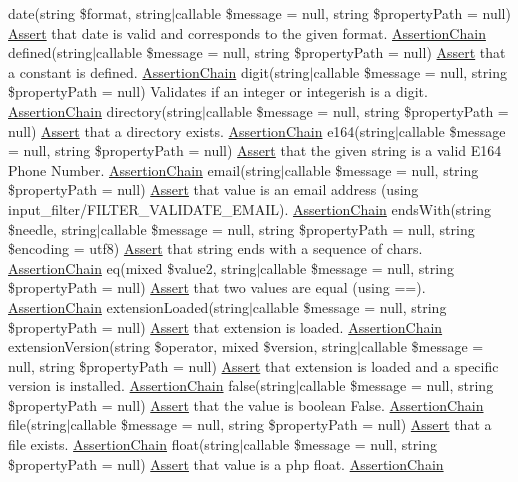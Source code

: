 date(string \$format, string$\vert$callable \$message = null, string \$property\+Path = null) \mbox{\hyperlink{class_assert_1_1_assert}{Assert}} that date is valid and corresponds to the given format.  \mbox{\hyperlink{class_assert_1_1_assertion_chain}{Assertion\+Chain}} defined(string$\vert$callable \$message = null, string \$property\+Path = null) \mbox{\hyperlink{class_assert_1_1_assert}{Assert}} that a constant is defined.  \mbox{\hyperlink{class_assert_1_1_assertion_chain}{Assertion\+Chain}} digit(string$\vert$callable \$message = null, string \$property\+Path = null) Validates if an integer or integerish is a digit.  \mbox{\hyperlink{class_assert_1_1_assertion_chain}{Assertion\+Chain}} directory(string$\vert$callable \$message = null, string \$property\+Path = null) \mbox{\hyperlink{class_assert_1_1_assert}{Assert}} that a directory exists.  \mbox{\hyperlink{class_assert_1_1_assertion_chain}{Assertion\+Chain}} e164(string$\vert$callable \$message = null, string \$property\+Path = null) \mbox{\hyperlink{class_assert_1_1_assert}{Assert}} that the given string is a valid E164 Phone Number.  \mbox{\hyperlink{class_assert_1_1_assertion_chain}{Assertion\+Chain}} email(string$\vert$callable \$message = null, string \$property\+Path = null) \mbox{\hyperlink{class_assert_1_1_assert}{Assert}} that value is an email address (using input\+\_\+filter/\+F\+I\+L\+T\+E\+R\+\_\+\+V\+A\+L\+I\+D\+A\+T\+E\+\_\+\+E\+M\+A\+IL).  \mbox{\hyperlink{class_assert_1_1_assertion_chain}{Assertion\+Chain}} ends\+With(string \$needle, string$\vert$callable \$message = null, string \$property\+Path = null, string \$encoding = \textquotesingle{}utf8\textquotesingle{}) \mbox{\hyperlink{class_assert_1_1_assert}{Assert}} that string ends with a sequence of chars.  \mbox{\hyperlink{class_assert_1_1_assertion_chain}{Assertion\+Chain}} eq(mixed \$value2, string$\vert$callable \$message = null, string \$property\+Path = null) \mbox{\hyperlink{class_assert_1_1_assert}{Assert}} that two values are equal (using ==).  \mbox{\hyperlink{class_assert_1_1_assertion_chain}{Assertion\+Chain}} extension\+Loaded(string$\vert$callable \$message = null, string \$property\+Path = null) \mbox{\hyperlink{class_assert_1_1_assert}{Assert}} that extension is loaded.  \mbox{\hyperlink{class_assert_1_1_assertion_chain}{Assertion\+Chain}} extension\+Version(string \$operator, mixed \$version, string$\vert$callable \$message = null, string \$property\+Path = null) \mbox{\hyperlink{class_assert_1_1_assert}{Assert}} that extension is loaded and a specific version is installed.  \mbox{\hyperlink{class_assert_1_1_assertion_chain}{Assertion\+Chain}} false(string$\vert$callable \$message = null, string \$property\+Path = null) \mbox{\hyperlink{class_assert_1_1_assert}{Assert}} that the value is boolean False.  \mbox{\hyperlink{class_assert_1_1_assertion_chain}{Assertion\+Chain}} file(string$\vert$callable \$message = null, string \$property\+Path = null) \mbox{\hyperlink{class_assert_1_1_assert}{Assert}} that a file exists.  \mbox{\hyperlink{class_assert_1_1_assertion_chain}{Assertion\+Chain}} float(string$\vert$callable \$message = null, string \$property\+Path = null) \mbox{\hyperlink{class_assert_1_1_assert}{Assert}} that value is a php float.  \mbox{\hyperlink{class_assert_1_1_assertion_chain}{Assertion\+Chain}} 